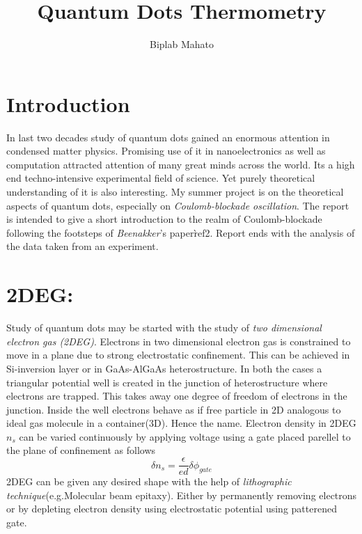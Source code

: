 \documentclass[a4paper]{report}
\begin{document}
  \begin{titlepage}
  \title{Quantum Dots Thermometry}
    \author{Biplab Mahato}
    \date{}
    \maketitle
  \end{titlepage}
  
  \section*{Introduction}
    \hspace{10pt} In last two decades study of quantum dots gained an enormous attention in condensed matter physics. Promising use of it in nanoelectronics as well as computation attracted attention of many great minds  across the world. Its a high end techno-intensive experimental field of science. Yet purely theoretical understanding of it is also interesting. My summer project is on the theoretical aspects of quantum dots, especially on \emph{Coulomb-blockade oscillation}. The report is intended to give a short introduction to the realm of Coulomb-blockade following the footsteps of \emph{Beenakker}'s paper\`{ref2}. Report ends with the analysis of the data taken from an experiment.
    
  \section*{2DEG:}
    \hspace{10pt} Study of quantum dots may be started with the study of \emph{two dimensional electron gas (2DEG)}. Electrons in two dimensional electron gas is constrained to move in a plane due to strong electrostatic confinement. This can be achieved in Si-inversion layer or in GaAs-AlGaAs heterostructure. In both the cases a triangular potential well is created in the junction of heterostructure where electrons are trapped. This takes away one degree of freedom of  electrons in the junction. Inside the well electrons behave as if free particle in 2D analogous to ideal gas molecule in a container(3D). Hence the name. Electron density in 2DEG $n_{s}$ can be varied continuously by applying voltage using a gate placed parellel to the plane of confinement as follows
    \begin{equation}\label{eqn1}
      \delta n_{s} =  \dfrac{\epsilon}{ed} \delta \phi_{gate}
    \end{equation} 
    \hspace{10pt} 2DEG can be given any desired shape with the help of \emph{lithographic technique}(e.g.Molecular beam epitaxy). Either by permanently removing electrons or by depleting electron density using electrostatic potential using patterened gate.
    
\end{document}
